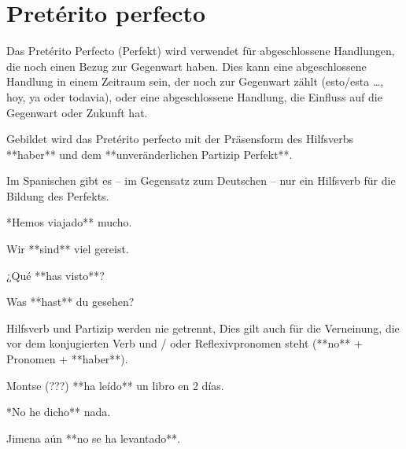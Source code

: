 \section*{Pretérito perfecto}

\begin{highlight}
Das Pretérito Perfecto (Perfekt) wird verwendet für abgeschlossene Handlungen, die noch einen
Bezug zur Gegenwart haben. Dies kann eine abgeschlossene Handlung in einem Zeitraum sein, der
noch zur Gegenwart zählt (esto/esta \ldots, hoy, ya oder todavia), oder eine abgeschlossene Handlung,
die Einfluss auf die Gegenwart oder Zukunft hat.
\end{highlight}

\begin{highlight}
Gebildet wird das Pretérito perfecto mit der Präsensform des Hilfsverbs **haber** und dem
**unveränderlichen Partizip Perfekt**.
\end{highlight}

\begin{hint}
\danger{}
Im Spanischen gibt es -- im Gegensatz zum Deutschen -- nur ein Hilfsverb
für die Bildung des Perfekts.
\end{hint}

\begin{compactitem}
    \item **Hemos viajado** mucho.
    \begin{compactitem}\itshape
        \item Wir **sind** viel gereist.
    \end{compactitem}
    \item ¿Qué **has visto**?
    \begin{compactitem}\itshape
        \item Was **hast** du gesehen?
    \end{compactitem}
\end{compactitem}

\begin{hint}
Hilfsverb und Partizip werden nie getrennt, Dies gilt auch für die Verneinung,
die vor dem konjugierten Verb und / oder Reflexivpronomen steht
(**no** + Pronomen + **haber**).
\end{hint}

\begin{compactitem}
    \item Montse (???) **ha leído** un libro en 2 días.
    \item **No he dicho** nada.
    \item Jimena aún **no se ha levantado**.
\end{compactitem}

